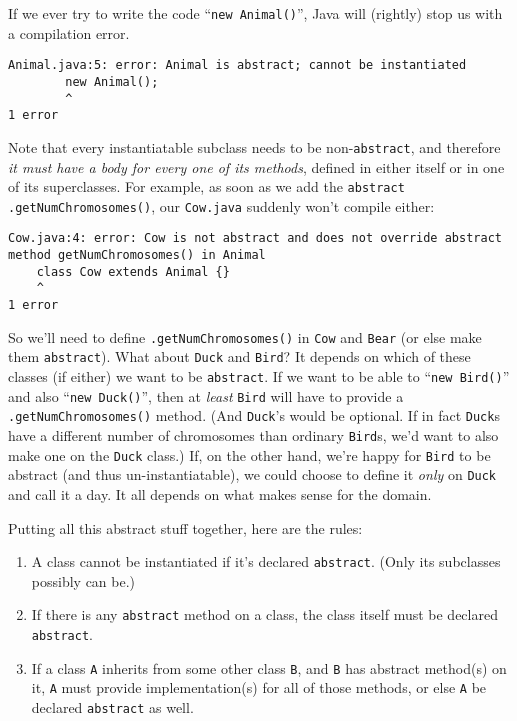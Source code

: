 If we ever try to write the code ``\texttt{new Animal()}'', Java will (rightly)
stop us with a compilation error.

\begin{Verbatim}[fontsize=\footnotesize,samepage=true]
Animal.java:5: error: Animal is abstract; cannot be instantiated
        new Animal();
        ^
1 error
\end{Verbatim}

\begin{samepage} Note that every instantiatable subclass needs to be
non-\texttt{abstract}, and therefore \textit{it must have a body for every one
of its methods}, defined in either itself or in one of its superclasses. For
example, as soon as we add the \texttt{abstract}
\texttt{.getNumChromosomes()}, our \texttt{Cow.java} suddenly won't compile
either:

\begin{Verbatim}[fontsize=\footnotesize,samepage=true]
Cow.java:4: error: Cow is not abstract and does not override abstract
method getNumChromosomes() in Animal
    class Cow extends Animal {}
    ^
1 error
\end{Verbatim}
\normalsize
\end{samepage}

So we'll need to define \texttt{.getNumChromosomes()} in \texttt{Cow} and
\texttt{Bear} (or else make them \texttt{abstract}). What about \texttt{Duck}
and \texttt{Bird}? It depends on which of these classes (if either) we want to
be \texttt{abstract}. If we want to be able to ``\texttt{new Bird()}'' and also
``\texttt{new Duck()}'', then at \textit{least} \texttt{Bird} will have to
provide a \texttt{.getNumChromosomes()} method. (And \texttt{Duck}'s would be
optional. If in fact \texttt{Duck}s have a different number of chromosomes
than ordinary \texttt{Bird}s, we'd want to also make one on the \texttt{Duck}
class.) If, on the other hand, we're happy for \texttt{Bird} to be abstract
(and thus un-instantiatable), we could choose to define it \textit{only} on
\texttt{Duck} and call it a day. It all depends on what makes sense for the
domain.

Putting all this abstract stuff together, here are the rules:

\begin{enumerate}
\itemsep.1em
\item A class cannot be instantiated if it's declared \texttt{abstract}. (Only
its subclasses possibly can be.)
\item If there is any \texttt{abstract} method on a class, the class itself
must be declared \texttt{abstract}.
\item If a class \texttt{A} inherits from some other class \texttt{B}, and
\texttt{B} has abstract method(s) on it, \texttt{A} must provide
implementation(s) for all of those methods, or else \texttt{A} be declared 
\texttt{abstract} as well.
\end{enumerate}

